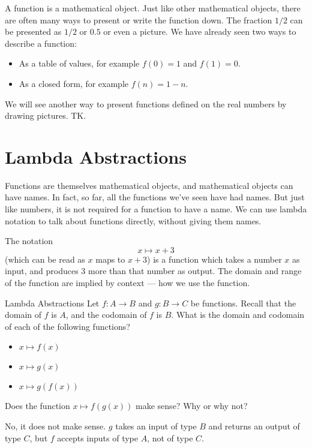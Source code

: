 \documentclass[a4paper,10pt]{report}
\begin{document}
A function is a mathematical object. Just like other mathematical objects, there are often
many ways to present or write the function down. The fraction \(1/2\) can be presented as
\(1/2\) or \(0.5\) or even a picture. We have already seen two ways to describe a function:

\begin{itemize}
  \item As a table of values, for example \(f(0) = 1\) and \(f(1) = 0\).
  \item As a closed form, for example \(f(n) = 1 - n\).
\end{itemize}

We will see another way to present functions defined on the real numbers by drawing
pictures. TK.

\section{Lambda Abstractions}

Functions are themselves mathematical objects, and mathematical objects can have names. In
fact, so far, all the functions we've seen have had names. But just like numbers, it is not
required for a function to have a name. We can use lambda notation to talk about functions
directly, without giving them names.

The notation \begin{equation}
  x \mapsto x + 3
  \label{fov:lambdap3}
\end{equation} (which can be read as \(x\) maps to \(x+3\)) is a function which takes a
number \(x\) as input, and produces \(3\) more than that number as output. The domain and
range of the function are implied by context --- how we use the function.

\begin{problem}{Lambda Abstractions}
  Let \(f: A \to B\) and \(g: B \to C\) be functions. Recall that the domain of \(f\) is
  \(A\), and the codomain of \(f\) is \(B\). What is the domain and codomain of each of the
  following functions?

  \begin{itemize}
    \item \(x \mapsto f(x)\) \hfill {}
    \item \(x \mapsto g(x)\) \hfill {}
    \item \(x \mapsto g(f(x))\) \hfill {}
  \end{itemize}

  Does the function \(x \mapsto f(g(x))\) make sense? Why or why not?

  \begin{solution}
    No, it does not make sense. \(g\) takes an input of type \(B\) and returns an
    output of type \(C\), but \(f\) accepts inputs of type \(A\), not of type \(C\).
  \end{solution}
\end{problem}
\end{document}

